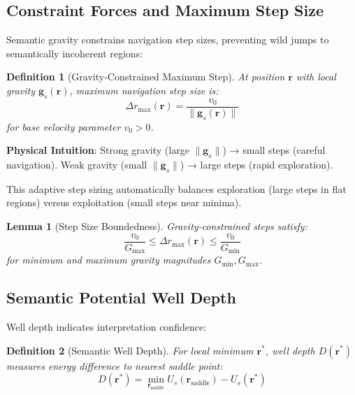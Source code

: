 \documentclass[12pt,a4paper]{article}
\newtheorem{lemma}{Lemma}
\newtheorem{definition}{Definition}
\begin{document}
\subsection{Constraint Forces and Maximum Step Size}

Semantic gravity constrains navigation step sizes, preventing wild jumps to semantically incoherent regions:

\begin{definition}[Gravity-Constrained Maximum Step]
At position $\mathbf{r}$ with local gravity $\mathbf{g}_s(\mathbf{r})$, maximum navigation step size is:
\begin{equation}
\Delta r_{\max}(\mathbf{r}) = \frac{v_0}{\|\mathbf{g}_s(\mathbf{r})\|}
\end{equation}
for base velocity parameter $v_0 > 0$.
\end{definition}

\textbf{Physical Intuition}: Strong gravity (large $\|\mathbf{g}_s\|$) → small steps (careful navigation). Weak gravity (small $\|\mathbf{g}_s\|$) → large steps (rapid exploration).

This adaptive step sizing automatically balances exploration (large steps in flat regions) versus exploitation (small steps near minima).

\begin{lemma}[Step Size Boundedness]
Gravity-constrained steps satisfy:
\begin{equation}
\frac{v_0}{G_{\max}} \leq \Delta r_{\max}(\mathbf{r}) \leq \frac{v_0}{G_{\min}}
\end{equation}
for minimum and maximum gravity magnitudes $G_{\min}, G_{\max}$.
\end{lemma}

\subsection{Semantic Potential Well Depth}

Well depth indicates interpretation confidence:

\begin{definition}[Semantic Well Depth]
For local minimum $\mathbf{r}^*$, well depth $D(\mathbf{r}^*)$ measures energy difference to nearest saddle point:
\begin{equation}
D(\mathbf{r}^*) = \min_{\mathbf{r}_{\text{saddle}}} U_s(\mathbf{r}_{\text{saddle}}) - U_s(\mathbf{r}^*)
\end{equation}
\end{definition}
\end{document}
